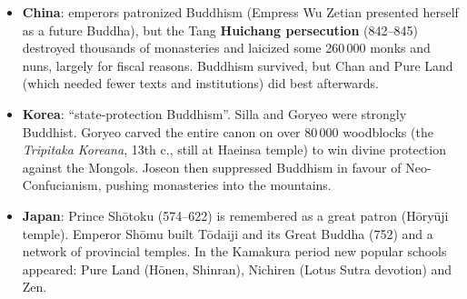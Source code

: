 \begin{itemize}
  \item \textbf{China}: emperors patronized Buddhism (Empress Wu Zetian presented herself
        as a future Buddha), but the Tang \textbf{Huichang persecution} (842--845)
        destroyed thousands of monasteries and laicized some 260\,000 monks and nuns,
        largely for fiscal reasons. Buddhism survived, but Chan and Pure Land (which needed
        fewer texts and institutions) did best afterwards.
  \item \textbf{Korea}: ``state-protection Buddhism''. Silla and Goryeo were strongly
        Buddhist. Goryeo carved the entire canon on over 80\,000 woodblocks (the
        \emph{Tripitaka Koreana}, 13th c., still at Haeinsa temple) to win divine
        protection against the Mongols. Joseon then suppressed Buddhism in favour of
        Neo-Confucianism, pushing monasteries into the mountains.
  \item \textbf{Japan}: Prince Shōtoku (574--622) is remembered as a great patron
        (Hōryūji temple). Emperor Shōmu built Tōdaiji and its Great Buddha (752) and a
        network of provincial temples. In the Kamakura period new popular schools appeared:
        Pure Land (Hōnen, Shinran), Nichiren (Lotus Sutra devotion) and Zen.
\end{itemize}

\begin{center}
\end{center}

